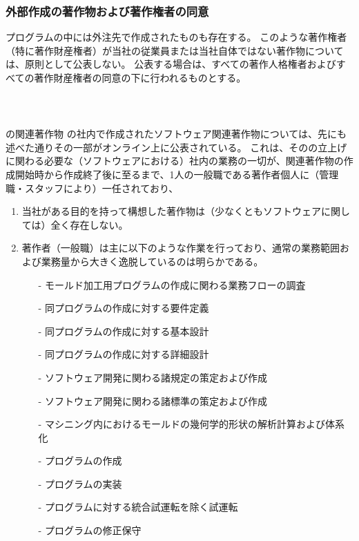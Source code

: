 \subsubsection{外部作成の著作物および著作権者の同意\label{subsec:copyrightsSubcontractor}}
プログラムの中には外注先で作成されたものも存在する。
このような著作権者（特に著作財産権者）が当社の従業員または当社自体ではない著作物については、原則として公表しない。
公表する場合は、すべての著作人格権者およびすべての著作財産権者の同意の下に行われるものとする。



\clearpage
~\vfill
\begin{Column}{\DMname の関連著作物}
\DMname の社内で作成されたソフトウェア関連著作物については、先にも述べた通りその一部がオンライン上に公表されている。
これは、その\DMname の立上げに関わる必要な（ソフトウェアにおける）社内の業務の一切が、関連著作物の作成開始時から作成終了後に至るまで、1人の一般職である著作者個人に（管理職・スタッフにより）一任されており、
\begin{enumerate}[label=\Roman*]
\item 当社がある目的を持って構想した著作物は（少なくともソフトウェアに関しては）全く存在しない。
\item
著作者（一般職）は主に以下のような作業を行っており、通常の業務範囲および業務量から大きく逸脱しているのは明らかである。
  \begin{enumerate}
  \item[-] モールド加工用プログラムの作成に関わる業務フローの調査
  \item[-] 同プログラムの作成に対する要件定義
  \item[-] 同プログラムの作成に対する基本設計
  \item[-] 同プログラムの作成に対する詳細設計
  \item[-] ソフトウェア開発に関わる諸規定の策定および作成
  \item[-] ソフトウェア開発に関わる諸標準の策定および作成
  \item[-] マシニング内におけるモールドの幾何学的形状の解析計算および体系化
  \item[-] プログラムの作成
  \item[-] プログラムの実装
  \item[-] プログラムに対する統合試運転を除く試運転
  \item[-] プログラムの修正保守

\end{enumerate}
\end{enumerate}
\end{Column}
